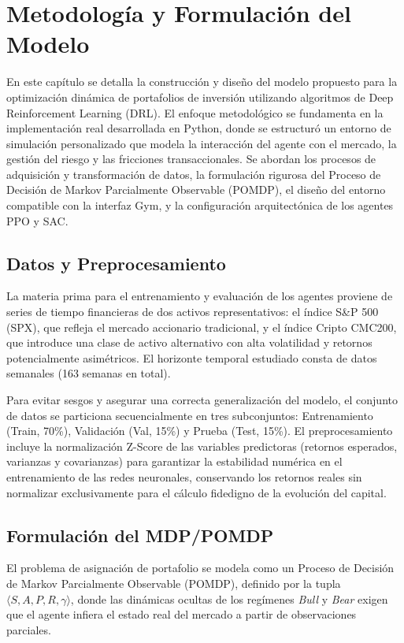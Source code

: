 \chapter{Metodología y Formulación del Modelo}

En este capítulo se detalla la construcción y diseño del modelo propuesto para la optimización dinámica de portafolios de inversión utilizando algoritmos de Deep Reinforcement Learning (DRL). El enfoque metodológico se fundamenta en la implementación real desarrollada en Python, donde se estructuró un entorno de simulación personalizado que modela la interacción del agente con el mercado, la gestión del riesgo y las fricciones transaccionales. Se abordan los procesos de adquisición y transformación de datos, la formulación rigurosa del Proceso de Decisión de Markov Parcialmente Observable (POMDP), el diseño del entorno compatible con la interfaz Gym, y la configuración arquitectónica de los agentes PPO y SAC.

\section{Datos y Preprocesamiento}
La materia prima para el entrenamiento y evaluación de los agentes proviene de series de tiempo financieras de dos activos representativos: el índice S\&P 500 (SPX), que refleja el mercado accionario tradicional, y el índice Cripto CMC200, que introduce una clase de activo alternativo con alta volatilidad y retornos potencialmente asimétricos. El horizonte temporal estudiado consta de datos semanales (163 semanas en total). 

Para evitar sesgos y asegurar una correcta generalización del modelo, el conjunto de datos se particiona secuencialmente en tres subconjuntos: Entrenamiento (Train, 70\%), Validación (Val, 15\%) y Prueba (Test, 15\%). El preprocesamiento incluye la normalización Z-Score de las variables predictoras (retornos esperados, varianzas y covarianzas) para garantizar la estabilidad numérica en el entrenamiento de las redes neuronales, conservando los retornos reales sin normalizar exclusivamente para el cálculo fidedigno de la evolución del capital.

\section{Formulación del MDP/POMDP}
El problema de asignación de portafolio se modela como un Proceso de Decisión de Markov Parcialmente Observable (POMDP), definido por la tupla $\langle S, A, P, R, \gamma \rangle$, donde las dinámicas ocultas de los regímenes \textit{Bull} y \textit{Bear} exigen que el agente infiera el estado real del mercado a partir de observaciones parciales.

